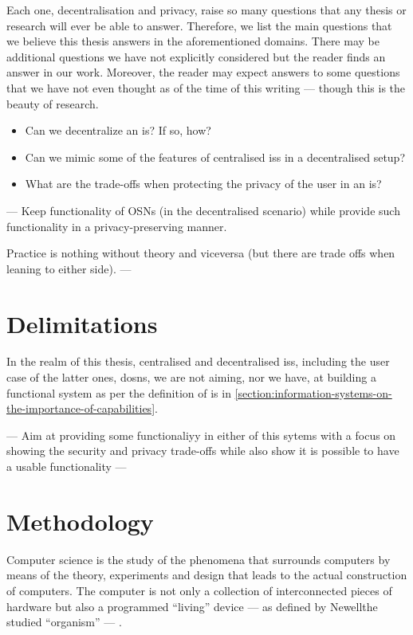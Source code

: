 \documentclass[showtrims,oldfontcommands]{kthesis}
\begin{document}
Each one, decentralisation and privacy, raise so many questions that any thesis 
or research will ever be able to answer. Therefore, we list the main questions that 
we believe this thesis answers in the aforementioned domains. There may be additional 
questions we have not explicitly considered but the reader finds an answer in our 
work. Moreover, the reader may expect answers to some questions that we have not 
even thought as of the time of this writing --- though this is the beauty of research.

\begin{itemize}
    \item Can we decentralize an \ac{is}? If so, how?\\
    \item Can we mimic some of the features of centralised \acp{is} in a decentralised setup?\\
    \item What are the trade-offs when protecting the privacy of the user in an \ac{is}?\\
\end{itemize}

---
Keep functionality of OSNs (in the decentralised scenario) while provide such functionality 
in a privacy-preserving manner.

Practice is nothing without theory and viceversa (but there are trade offs when leaning to either side).
---

\section{Delimitations}
    \label{section:delimitations}
In the realm of this thesis, centralised and decentralised \acp{is}, including the 
user case of the latter ones, \acp{dosn}, we are not aiming, nor we have, at building 
a functional system as per the definition of \ac{is} in \cref{section:information-systems-on-the-importance-of-capabilities}.

---
Aim at providing some functionaliyy in either of this sytems with a focus on showing
the security and privacy trade-offs while also show it is possible to have a usable
functionality
---

\section{Methodology}
    \label{section:methodoloy}
Computer science is the study of the phenomena that surrounds computers by means 
of the theory, experiments and design that leads to the actual construction of computers. 
The computer is not only a collection of interconnected pieces of hardware but also 
a programmed ``living'' device --- as defined by Newell\etal the studied ``organism'' 
--- \cite{NewellS76}.
\end{document}
